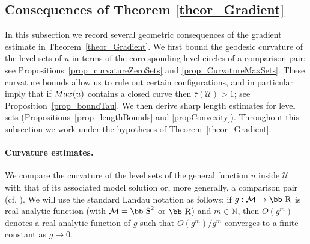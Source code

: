 \documentclass[11pt]{article}
\def\r{\hbox{\bb R}}
\def\s{\hbox{\bb S}}
\newcommand{\Max}{\textup{Max}}
\newcommand{\U}{\mathcal{U}}
\numberwithin{equation} {section}
\begin{document}
\subsection{Consequences of Theorem \ref{theor_Gradient}}\label{sectionConsequences}

In this subsection we record several geometric consequences of the gradient estimate in Theorem~\ref{theor_Gradient}.
We first bound the geodesic curvature of the level sets of $u$ in terms of the corresponding level circles of a comparison pair; see Propositions~\ref{prop_curvatureZeroSets} and \ref{prop_CurvatureMaxSets}.
These curvature bounds allow us to rule out certain configurations, and in particular imply that if $\Max(u)$ contains a closed curve then $\overline{\tau}(\U)>1$; see Proposition~\ref{prop_boundTau}.
We then derive sharp length estimates for level sets (Propositions~\ref{prop_lengthBounds} and \ref{propConvexity}). Throughout this subsection we work under the hypotheses of Theorem~\ref{theor_Gradient}.

\paragraph{Curvature estimates.}

We compare the curvature of the level sets of the general function $u$ inside $\U$ with that of its associated model solution or, more generally, a comparison pair (cf. \cite[Subsection 4.2]{EMa}). We will use the standard Landau notation as follows: if $g:\mathcal{M}\to\r$ is real analytic function (with $\mathcal{M}=\s^2$ or $\r$) and $m\in\mathbb{N}$, then $O(g^m)$ denotes a real analytic function of $g$ such that $O(g^m)/g^m$ converges to a finite constant as $g\to 0$.
\end{document}
